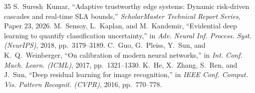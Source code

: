 \documentclass[10pt,journal,compsoc]{IEEEtran}
\begin{document}
\begin{thebibliography}{35}
 S.~Suresh~Kumar, ``Adaptive trustworthy edge systems: Dynamic risk-driven cascades and real-time SLA bounds,'' \emph{ScholarMaster Technical Report Series}, Paper 23, 2026.
 M.~Sensoy, L.~Kaplan, and M.~Kandemir, ``Evidential deep learning to quantify classification uncertainty,'' in \emph{Adv. Neural Inf. Process. Syst. (NeurIPS)}, 2018, pp.~3179--3189.
 C.~Guo, G.~Pleiss, Y.~Sun, and K.~Q.~Weinberger, ``On calibration of modern neural networks,'' in \emph{Int. Conf. Mach. Learn. (ICML)}, 2017, pp.~1321--1330.
 K.~He, X.~Zhang, S.~Ren, and J.~Sun, ``Deep residual learning for image recognition,'' in \emph{IEEE Conf. Comput. Vis. Pattern Recognit. (CVPR)}, 2016, pp.~770--778.
\end{thebibliography}
\end{document}
